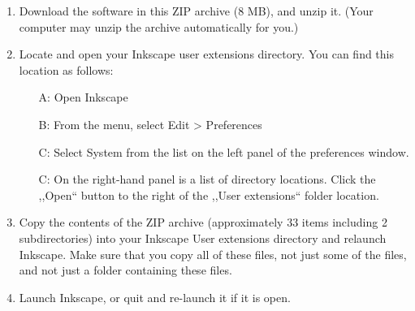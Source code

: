 \begin{enumerate}
  \item         Download the software in this ZIP archive (8 MB), and unzip it. (Your computer may unzip the archive automatically for you.)
  \item         Locate and open your Inkscape user extensions directory. You can find this location as follows:\begin{itemize}

  \item[A:]               Open Inkscape
  \item[B:]               From the menu, select Edit > Preferences
  \item[C:]               Select System from the list on the left panel of the preferences window.
  \item[C:]               On the right-hand panel is a list of directory locations. Click the ,,Open`` button to the right of the ,,User extensions`` folder location.
  \end{itemize}
  \item         Copy the contents of the ZIP archive (approximately 33 items including 2 subdirectories) into your Inkscape User extensions directory and relaunch Inkscape. Make sure that you copy all of these files, not just some of the files, and not just a folder containing these files.
  \item         Launch Inkscape, or quit and re-launch it if it is open.
\end{enumerate}





